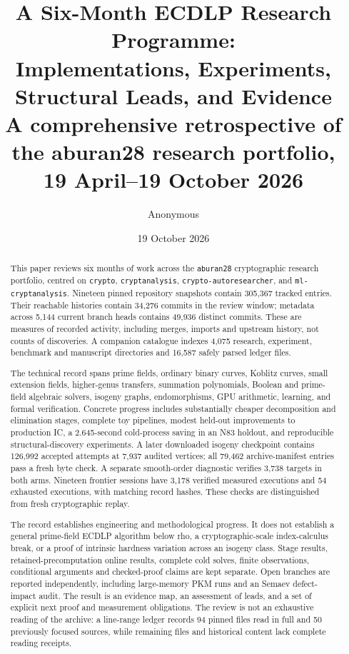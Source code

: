 \documentclass[10pt,a4paper]{article}
\title{A Six-Month ECDLP Research Programme:\\
Implementations, Experiments, Structural Leads, and Evidence\\[5pt]
\large A comprehensive retrospective of the aburan28 research portfolio,\\
19 April--19 October 2026}
\author{Anonymous}
\date{19 October 2026}
\begin{document}
\maketitle
\begin{abstract}
This paper reviews six months of work across the \texttt{aburan28}
cryptographic research portfolio, centred on \texttt{crypto},
\texttt{cryptanalysis}, \texttt{crypto-autoresearcher}, and
\texttt{ml-cryptanalysis}. Nineteen pinned repository snapshots contain
305,367 tracked entries. Their reachable histories contain 34,276 commits
in the review window; metadata across 5,144 current branch heads contains
49,936 distinct commits. These are measures of recorded activity, including
merges, imports and upstream history, not counts of discoveries. A companion
catalogue indexes 4,075 research, experiment, benchmark and manuscript
directories and 16,587 safely parsed ledger files.

The technical record spans prime fields, ordinary binary curves, Koblitz
curves, small extension fields, higher-genus transfers, summation
polynomials, Boolean and prime-field algebraic solvers, isogeny graphs,
endomorphisms, GPU arithmetic, learning, and formal verification. Concrete
progress includes substantially cheaper decomposition and elimination
stages, complete toy pipelines, modest held-out improvements to production
IC, a 2.645-second cold-process saving in an N83 holdout, and reproducible
structural-discovery experiments. A later downloaded isogeny checkpoint contains
126,992 accepted attempts at 7,937 audited vertices; all 79,462 archive-manifest
entries pass a fresh byte check. A separate smooth-order diagnostic verifies
3,738 targets in both arms. Nineteen frontier sessions have 3,178
verified measured executions and 54 exhausted executions, with matching
record hashes. These checks are distinguished from fresh cryptographic
replay.

The record establishes engineering and methodological progress. It does
not establish a general prime-field ECDLP algorithm below rho, a
cryptographic-scale index-calculus break, or a proof of intrinsic hardness
variation across an isogeny class. Stage results, retained-precomputation
online results, complete cold solves, finite observations, conditional
arguments and checked-proof claims are kept separate. Open branches are
reported independently, including large-memory PKM runs and an Semaev
defect-impact audit. The result is an evidence map, an assessment of leads,
and a set of explicit next proof and measurement obligations.
The review is not an exhaustive reading of the archive: a line-range ledger
records 94 pinned files read in full and 50 previously focused sources,
while remaining files and historical content lack complete reading receipts.
\end{abstract}
\tableofcontents
\clearpage












\appendix


\clearpage
\end{document}
